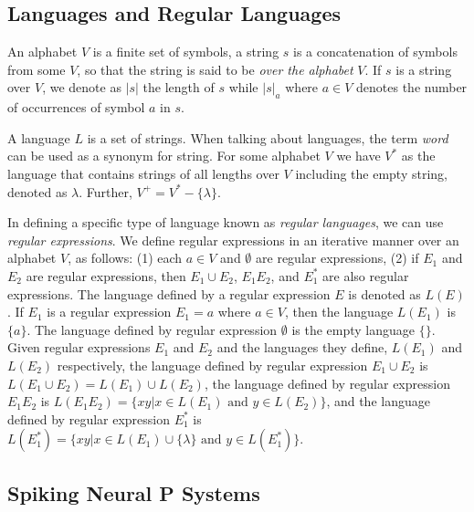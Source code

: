 \documentclass[]{elsarticle}
\theoremstyle{definition}
\theoremstyle{definition}
\begin{document}
\subsection{Languages and Regular Languages} \label{sec-prelim-lang}

An alphabet $V$ is a finite set of symbols, a string $s$ is a concatenation of symbols from some $V$, so that the string is said to be \textit{over
the alphabet} $V$. If $s$ is a string over $V$, we denote as $|s|$ the length of $s$ while $|s|_a$ where $a \in V$ denotes the number of occurrences 
of symbol $a$ in $s$. 
  
A language $L$ is a set of strings. When talking about languages, the term \textit{word} can be
used as a synonym for string. For some alphabet $V$ we have $V^*$ as the language that contains
strings of all lengths over $V$ including the empty string, denoted as $\lambda$. Further, 
$V^+ = V^* - \{\lambda\}$. 

In defining a specific type of language known as \textit{regular languages}, we can use
\textit{regular expressions}. We define regular expressions in an iterative manner over an alphabet
$V$, as follows: (1) each $a \in V$ and $\emptyset$ are regular expressions, (2) if $E_1$ and $E_2$ are regular expressions, then $E_1 \cup E_2$,
$E_1 E_2$, and $E_1^*$ are also regular expressions. The language defined by a regular expression $E$ is denoted as $L(E)$. If $E_1$ is a regular
expression $E_1 = a$ where  $a \in V$, then the language $L(E_1)$ is $\{a\}$. The language defined by regular expression $\emptyset$ is the empty
language $\{\}$. Given regular expressions $E_1$ and $E_2$ and the languages they define, $L(E_1)$ and $L(E_2)$ respectively, the language
defined by regular expression $E_1 \cup E_2$ is  $L(E_1 \cup E_2) =L(E_1) \cup L(E_2)$, the language defined by regular expression $E_1 E_2$
is $L(E_1 E_2) = \{xy|x \in L(E_1) \text{ and } y \in L(E_2) \}$, and the language defined by regular expression $E_1^*$ is $L(E_1^*) = \{xy|
x \in L(E_1) \cup \{\lambda\} \text{ and } y \in L(E_1^*)\}$. 


\subsection{Spiking Neural P Systems}\label{sec-prelim-snp}
\cite{chen-2008-snp-e}
\end{document}
